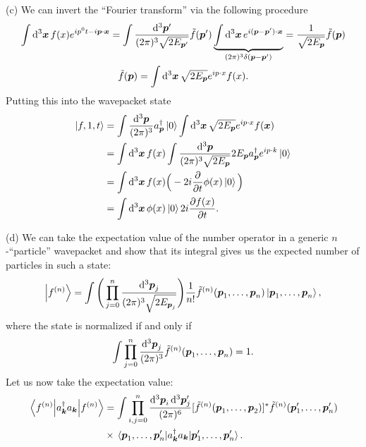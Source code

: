 {(c) We can invert the ``Fourier transform'' via the following procedure
\begin{gather}
    \int \dd[3]{\vb*{x}} f(x) e^{i p^{0} t - i \vb*{p} \cdot \vb*{x}} = \int \frac{\dd[3]{\vb*{p}'}}{(2 \pi)^3 \sqrt{2 E_{\vb*{p}'}}} \tilde{f}(\vb*{p}') \underbrace{ \int \dd[3]{\vb*{x}} e^{i ( \vb*{p} - \vb*{p}') \cdot \vb*{x}} }_{(2 \pi)^3 \delta(\vb*{p} - \vb*{p}')} = \frac{1}{\sqrt{2 E_{\vb*{p}}}} \tilde{f}(\vb*{p}) \nonumber \\
    \tilde{f}(\vb*{p}) = \int \dd[3]{\vb*{x}} \sqrt{2 E_{\vb*{p}}} e^{i p \cdot x} f(x)
.\end{gather}
Putting this into the wavepacket state
\begin{align}
    \ket{f,1,t} &= \int \frac{\dd[3]{\vb*{p}}}{(2 \pi)^3} a_{\vb*{p}}^{\dagger} \ket{0} \int \dd[3]{\vb*{x}} \sqrt{2 E_{\vb*{p}}} e^{i p \cdot x} f(\vb*{x}) \nonumber \\
                &= \int \dd[3]{\vb*{x}} f(x) \int \frac{\dd[3]{\vb*{p}}}{(2 \pi)^3 \sqrt{2 E_{\vb*{p}}}} 2 E_{\vb*{p}} a_{\vb*{p}}^{\dagger} e^{i p \cdot k} \ket{0} \nonumber \\
                &= \int \dd[3]{\vb*{x}} f(x) \Big( -2 i \pdv{t} \phi(x) \ket{0} \Big) \nonumber \\
                &= \int \dd[3]{\vb*{x}} \phi(x) \ket{0} 2 i \pdv{f(x)}{t}
.\end{align}


(d) We can take the expectation value of the number operator in a generic $n$-``particle'' wavepacket and show that its integral gives us the expected number of particles in such a state:
\begin{align}
    \ket{f^{(n)}} = \int \Bigg( \prod_{j=0}^{n} \frac{\dd[3]{\vb*{p}_{j}}}{(2 \pi)^3 \sqrt{2 E_{\vb*{p}_{j}}}} \Bigg) \frac{1}{n!} \tilde{f}^{(n)}(\vb*{p}_{1},\ldots,\vb*{p}_{n}) \ket{\vb*{p}_{1},\ldots,\vb*{p}_{n}}
,\end{align}
where the state is normalized if and only if
\begin{align}
    \int \prod_{j=0}^{n} \frac{\dd[3]{\vb*{p}_{j}}}{(2 \pi)^3} \tilde{f}^{(n)}(\vb*{p}_{1},\ldots,\vb*{p}_{n}) = 1
.\end{align}
Let us now take the expectation value:
\begin{align}
    \mel{f^{(n)}}{a_{\vb*{k}}^{\dagger} a_{\vb*{k}}}{f^{(n)}} &= \int \prod_{i,j=0}^{n} \frac{\dd[3]{\vb*{p}_{i}} \dd[3]{\vb*{p}_{j}'}}{(2 \pi)^6} [\tilde{f}^{(n)}(\vb*{p}_{1},\ldots,\vb*{p}_{2})]^{*} \tilde{f}^{(n)}(\vb*{p}_{1}',\ldots,\vb*{p}_{n}') \nonumber \\
                                                              &\times \mel{\vb*{p}_{1},\ldots,\vb*{p}_{n}'}{a_{\vb*{k}}^{\dagger} a_{\vb*{k}}}{\vb*{p}_{1}',\ldots,\vb*{p}_{n}'}
.\end{align}


}


